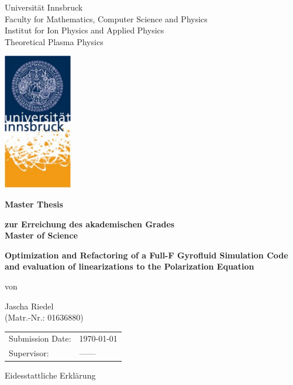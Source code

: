 \documentclass[12pt,oneside,bibtotoc,liststotoc]{scrbook}
\begin{document}
\thispagestyle{empty}
\begin{center}
\LARGE{Universität Innsbruck\\
Faculty for Mathematics, Computer Science and Physics}\\[3ex]
\large{Institut for Ion Physics and Applied Physics}\\[2ex]
\large{Theoretical Plasma Physics}
\end{center}
\medskip

\begin{center}
\includegraphics[width=3cm]{Logo}
\vspace{1.5cm}

\textbf{\LARGE{Master Thesis}}
\medskip\par
\textbf{\normalsize{zur Erreichung des akademischen Grades}} \\[3ex]
\textbf{\Large{Master of Science}}
\vspace{2cm}

\textbf{\Large{Optimization and Refactoring of a Full-F Gyrofluid Simulation Code and evaluation of linearizations to the Polarization Equation}}
\bigskip\par
von \par
\large{Jascha Riedel}\\
(Matr.-Nr.: 01636880)
\end{center}
\vspace{1cm}

\begin{tabular}{ll}
  Submission Date:  & \today \\
  Supervisor: & ------ \\
\end{tabular}

\newpage

\vspace*{5cm}

\begin{center}
\LARGE{Eidesstattliche Erklärung}\\
\end{center}
\vspace{1cm}
\end{document}
